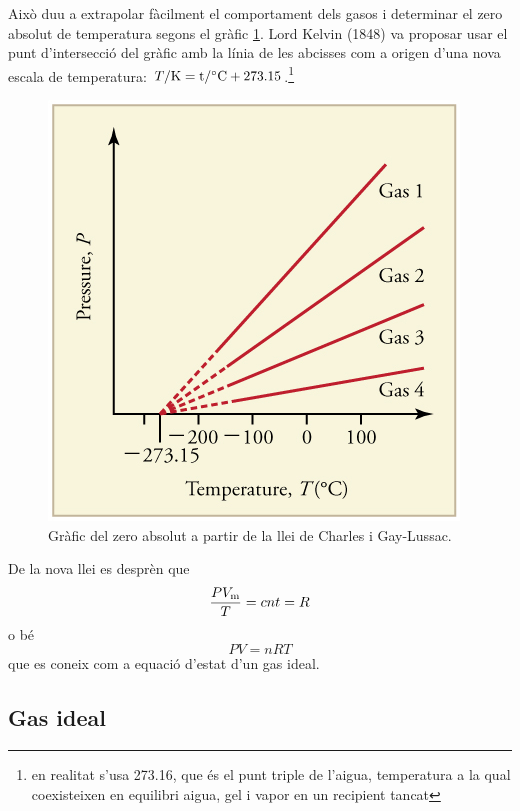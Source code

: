 Això duu a extrapolar fàcilment el comportament dels gasos i determinar el zero absolut de temperatura segons el gràfic \ref{fig:zeroabsolut}. Lord Kelvin (1848) va proposar usar el punt d'intersecció del gràfic amb la línia de les abcisses com a origen d'una nova escala de temperatura: $T/\rm{K} = t/\degree \rm{C} + 273.15$.\footnote{en realitat s'usa 273.16, que és el punt triple de l'aigua, temperatura a la qual coexisteixen en equilibri aigua, gel i vapor en un recipient tancat}
\begin{figure}[h]
\centering
\includegraphics[scale=1.0]{figures/zeroabsolut.png}
\caption{Gràfic del zero absolut a partir de la llei de Charles i Gay-Lussac.}
\label{fig:zeroabsolut}
\end{figure}

De la nova llei es desprèn que 
\[\frac{P V_{\rm m}}{T}= cnt = R\]
o bé
\[P V = n R T\]
que es coneix com a equació d'estat d'un gas ideal.

\subsection{Gas ideal}

